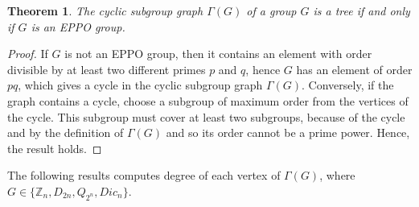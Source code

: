 \documentclass[11pt,twoside]{amsart}
\def \Z {{\mathbb{Z}}}
\def \Ga {{\Gamma }}
\newtheorem{theorem}{Theorem}[section]
\begin{document}
\begin{theorem}
    The cyclic subgroup graph $\Gamma (G)$ of a group $G$ is a tree if and only if $G$ is an EPPO group.
\end{theorem}

\begin{proof}
    If $G$ is not an EPPO group, then it contains an element with order divisible by at least two different primes $p$ and $q$, hence $G$ has an element of order $pq$, which gives a cycle in the cyclic subgroup graph $\Gamma (G)$. Conversely, if the graph contains a cycle, choose a subgroup of maximum order from the vertices of the cycle. This subgroup must cover at least two subgroups, because of the cycle and by the definition of $\Gamma (G)$  and so its order cannot be a prime power. Hence, the result holds.

\end{proof}
\noindent The following results computes degree of each vertex of $\Ga(G)$, where $G\in \{\Z_n, D_{2n}, Q_{2^n}, Dic_n\}.$
\end{document}

